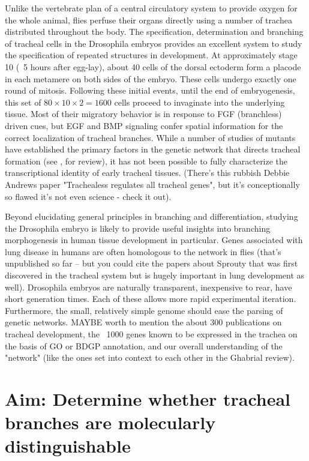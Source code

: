 \documentclass{proposal}
\begin{document}
Unlike the vertebrate plan of a central circulatory system to provide oxygen for the whole animal, flies perfuse their organs directly using a number of trachea distributed throughout the body.
The specification, determination and branching of tracheal cells in the Drosophila embryos provides an excellent system to study the specification of repeated structures in development.
At approximately stage 10 (~5 hours after egg-lay), about 40 cells of the dorsal ectoderm form a placode in each metamere on both sides of the embryo.
These cells undergo exactly one round of mitosis.
Following these initial events, until the end of embryogenesis, this set of $80 \times 10 \times 2 = 1600$ cells proceed to invaginate into the underlying tissue.
Most of their migratory behavior is in response to FGF (branchless) driven cues, but EGF and BMP signaling confer spatial information for the correct localization of tracheal branches.
While a number of studies of mutants have established the primary factors in the genetic network that directs tracheal formation (see \cite{Ghabrial:2003kz}, for review), it has not been possible to fully characterize the transcriptional identity of early tracheal tissues.
(There's this rubbish Debbie Andrews paper "Trachealess regulates all tracheal genes", but it's conceptionally so flawed it's not even science - check it out).

Beyond elucidating general principles in branching and differentiation, studying the Drosophila embryo is likely to provide useful insights into branching morphogenesis in human tissue development in particular.
Genes associated with lung disease in humans are often homologous to the network in flies (that's unpublished so far -- but you could cite the papers about Sprouty that was first discovered in the tracheal system but is hugely important in lung development as well).
Drosophila embryos are naturally transparent, inexpensive to rear, have short generation times.
Each of these allows more rapid experimental iteration.
Furthermore, the small, relatively simple genome should ease the parsing of genetic networks.
MAYBE worth to mention the about 300 publications on tracheal development, the ~1000 genes known to be expressed in the trachea on the basis of GO or BDGP annotation, and our overall understanding of the "network" (like the ones set into context to each other in the Ghabrial review).


\section{Aim: Determine whether tracheal branches are molecularly distinguishable}
\end{document}
